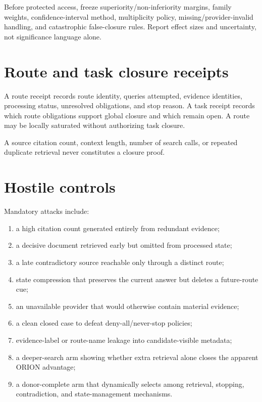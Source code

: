 \documentclass[11pt]{article}
\begin{document}
Before protected access, freeze superiority/non-inferiority margins, family weights, confidence-interval method, multiplicity policy, missing/provider-invalid handling, and catastrophic false-closure rules. Report effect sizes and uncertainty, not significance language alone.

\section{Route and task closure receipts}
A route receipt records route identity, queries attempted, evidence identities, processing status, unresolved obligations, and stop reason. A task receipt records which route obligations support global closure and which remain open. A route may be locally saturated without authorizing task closure.

A source citation count, context length, number of search calls, or repeated duplicate retrieval never constitutes a closure proof.

\section{Hostile controls}
Mandatory attacks include:
\begin{enumerate}
    \item a high citation count generated entirely from redundant evidence;
    \item a decisive document retrieved early but omitted from processed state;
    \item a late contradictory source reachable only through a distinct route;
    \item state compression that preserves the current answer but deletes a future-route cue;
    \item an unavailable provider that would otherwise contain material evidence;
    \item a clean closed case to defeat deny-all/never-stop policies;
    \item evidence-label or route-name leakage into candidate-visible metadata;
    \item a deeper-search arm showing whether extra retrieval alone closes the apparent ORION advantage;
    \item a donor-complete arm that dynamically selects among retrieval, stopping, contradiction, and state-management mechanisms.
\end{enumerate}
\end{document}

